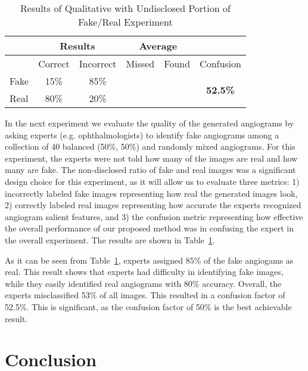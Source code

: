 \documentclass[runningheads]{llncs}
\begin{document}
\begin{table}[htb]
\caption{Results of Qualitative with Undisclosed Portion of Fake/Real Experiment}
    \label{table3}
\centering
\begin{tabular}{l|c|c|c|c|c} 
\hline
&\multicolumn{2}{c|}{\small Results} & \multicolumn{2}{c|}{ \small Average} & \\\hline
& \small Correct & \small Incorrect & \small Missed & \small Found & \small Confusion\\\hline
\small Fake & \small 15\% & \small 85\% & \small \multirow{2}{*}{53\%} & \small \multirow{2}{*}{48\%} & \multirow{2}{*}{\small \textbf{52.5\%}} \\
\small Real & \small 80\% & \small 20\% & & & \\
\hline
\end{tabular}
\end{table}

In the next experiment we evaluate the quality of the generated angiograms by asking experts (e.g. ophthalmologists) to identify fake angiograms among a collection of 40 balanced (50\%, 50\%) and randomly mixed angiograms. For this experiment, the experts were not told how many of the images are real and how many are fake. The non-disclosed ratio of fake and real images was a significant design choice for this experiment, as it will allow us to evaluate three metrics: 1) incorrectly labeled fake images representing how real the generated images look, 2) correctly labeled real images representing how accurate the experts recognized angiogram salient features, and 3) the confusion metric representing how effective the overall performance of our proposed method was in confusing the expert in the overall experiment. The results are shown in Table~\ref{table3}.

As it can be seen from Table~\ref{table3}, experts assigned 85\% of the fake angiogams as real. This result shows that experts had difficulty in identifying fake images, while they easily identified real angiograms with 80\% accuracy. Overall, the experts misclassified 53\% of all images. This resulted in a confusion factor of 52.5\%. This is significant, as the confusion factor of 50\% is the best achievable result.



\section{Conclusion}
\end{document}
